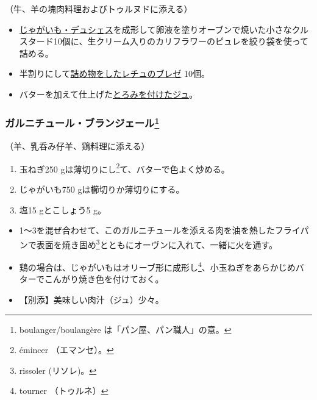 \begin{recette}
（牛、羊の塊肉料理およびトゥルヌドに添える）

\begin{itemize}
\item
  \protect\hyperlink{pommes-de-terre-duchesse}{じゃがいも・デュシェス}を成形して卵液を塗りオーブンで焼いた小さなクルスタード10個に、生クリーム入りのカリフラワーのピュレを絞り袋を使って詰める。
\item
  半割りにして\protect\hyperlink{laitues-farcies-pour-garniture}{詰め物をしたレチュのブレゼ}
  10個。
\item
  バターを加えて仕上げた\protect\hyperlink{jus-de-veau-lie}{とろみを付けたジュ}。
\end{itemize}

\atoaki{}

\hypertarget{garniture-boulangere}{%
\subsubsection[ガルニチュール・ブランジェール]{\texorpdfstring{ガルニチュール・ブランジェール\footnote{boulanger/boulangère
  は「パン屋、パン職人」の意。}}{ガルニチュール・ブランジェール}}\label{garniture-boulangere}}



（羊、乳呑み仔羊、鶏料理に添える）

\begin{enumerate}
\def\labelenumi{\arabic{enumi}.}
\item
  玉ねぎ250 gは薄切りにし\footnote{émincer （エマンセ）。}て、バターで色よく炒める。
\item
  じゃがいも750 gは櫛切りか薄切りにする。
\item
  塩15 gとこしょう5 g。
\end{enumerate}

\begin{itemize}
\item
  1〜3を混ぜ合わせて、このガルニチュールを添える肉を油を熱したフライパンで表面を焼き固め\footnote{rissoler
    (リソレ)。}とともにオーヴンに入れて、一緒に火を通す。
\item
  鶏の場合は、じゃがいもはオリーブ形に成形し\footnote{tourner
    （トゥルネ）}、小玉ねぎをあらかじめバターでこんがり焼き色を付けておく。
\item
  【別添】美味しい肉汁（ジュ）少々。
\end{itemize}


\end{recette}
